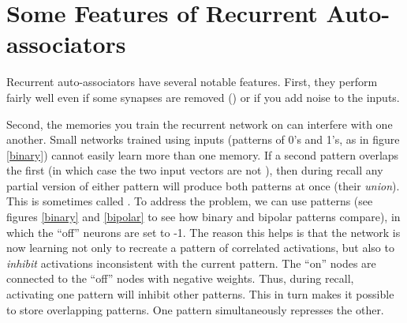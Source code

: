 
\section{Some Features of Recurrent Auto-associators}

Recurrent auto-associators have several notable features. First, they perform fairly well even if some synapses are removed () or if you add noise to the inputs.

Second, the memories you train the recurrent network on can interfere with one another. Small networks trained using  inputs (patterns of 0's and 1's, as in figure \ref{binary}) cannot easily learn more than one memory. If a second pattern overlaps the first (in which case the two input vectors are not ), then during recall any partial version of either pattern will produce both patterns at once (their \emph{union}). This is sometimes called . To address the problem, we can use  patterns (see figures \ref{binary} and \ref{bipolar} to see how binary and bipolar patterns compare), in which the ``off'' neurons are set to -1. The reason this helps is that the network is now learning not only to recreate a pattern of correlated activations, but also to \emph{inhibit} activations inconsistent with the current pattern. The ``on'' nodes are connected to the ``off'' nodes with negative weights. Thus, during recall, activating one pattern will inhibit other patterns. This in turn makes it possible to store overlapping patterns. One pattern simultaneously represses the other. 

